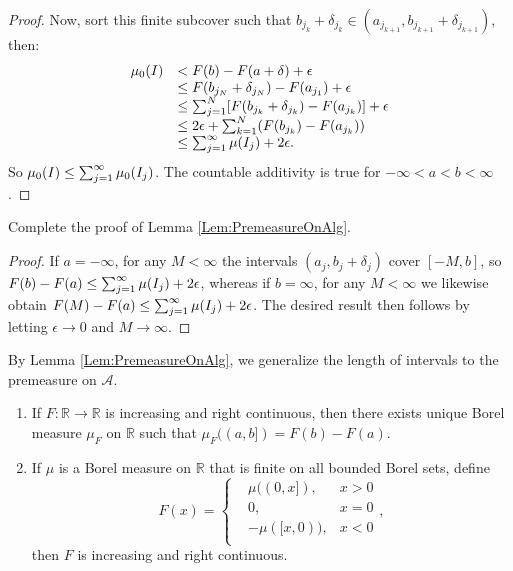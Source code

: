 \begin{proof}
    Now, sort this finite subcover such that $b_{j_k}+\delta_{j_k}
    \in(a_{j_{k+1}},b_{j_{k+1}}+\delta_{j_{k+1}})$, then:
    \begin{displaymath}
        \begin{array}{rl}
            \mu_{0}(I)&<F(b)-F(a+\delta)+\epsilon\\
            &\le F(b_{j_N}+\delta_{j_N})-F(a_{j_1})+\epsilon\\
            &\le\sum_{j=1}^{N}[F(b_{j_{k}}+\delta_{j_k})-F(a_{j_k})]+\epsilon\\
            &\le 2\epsilon+\sum_{k=1}^{N}(F(b_{j_k})-F(a_{j_k}))\\
            &\le\sum_{j=1}^{\infty}\mu(I_j)+2\epsilon.
        \end{array}
    \end{displaymath}
    So $\mu_{0}(I)\le\sum_{j=1}^{\infty}\mu_{0}(I_j)$. 
    The countable additivity is true 
    for $-\infty<a<b<\infty$. 
\end{proof}
\begin{exc}
    Complete the proof of Lemma \ref{Lem:PremeasureOnAlg}.
\end{exc}
\begin{proof}
    If $a=-\infty$, for any $M<\infty$ the intervals $(a_j,b_j+\delta_j)$
    cover $[-M,b]$, so $F(b)-F(a)\leq\sum_{j=1}^{\infty}\mu(I_j)+2\epsilon$, 
    whereas if $b=\infty$, for any $M<\infty$ we likewise obtain 
    $F(M)-F(a)\leq\sum_{j=1}^{\infty}\mu(I_j)+2\epsilon$. The desired 
    result then follows by letting $\epsilon\rightarrow 0$ and
    $M\rightarrow\infty$. 
\end{proof}
\begin{rem}
    By Lemma \ref{Lem:PremeasureOnAlg}, we generalize 
    the length of intervals to the premeasure on $\mathcal{A}$.
\end{rem}
\begin{thm}
    \label{Thm:BorelMeasAndGenFunc}

    \begin{enumerate}
        \item If $F:\mathbb{R}\rightarrow\mathbb{R}$ is increasing and 
        right continuous, then there exists unique Borel measure 
        $\mu_{F}$ on $\mathbb{R}$ such that 
        $\mu_{F}((a,b])=F(b)-F(a)$.
        \item If $\mu$ is a Borel measure on $\mathbb{R}$ that is 
        finite on all bounded Borel sets, define 
        \begin{displaymath}
            F(x)=\left\{
                \begin{array}{rll}
                    &\mu((0,x]),&x>0\\
                    &0,&x=0\\
                    &-\mu([x,0)),&x<0\\
                \end{array}
            \right.,
        \end{displaymath}
        then $F$ is increasing and right continuous.
    \end{enumerate}
\end{thm}
